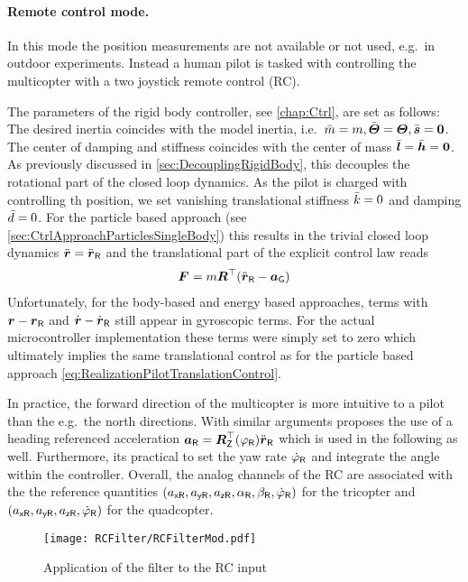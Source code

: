 \paragraph{Remote control mode.}
In this mode the position measurements are not available or not used, e.g.\ in outdoor experiments.
Instead a human pilot is tasked with controlling the multicopter with a two joystick remote control (RC).

The parameters of the rigid body controller, see \autoref{chap:Ctrl}, are set as follows:
The desired inertia coincides with the model inertia, i.e.\ $\bar{m} = m, \bar{\boldsymbol{\varTheta}} = \boldsymbol{\varTheta}, \bar{\boldsymbol{s}}=\boldsymbol{0}$.
The center of damping and stiffness coincides with the center of mass $\bar{\boldsymbol{l}}=\bar{\boldsymbol{h}}=\boldsymbol{0}$.
As previously discussed in \autoref{sec:DecouplingRigidBody}, this decouples the rotational part of the closed loop dynamics.
As the pilot is charged with controlling th position, we set vanishing translational stiffness $\bar{k}=0$ and damping $\bar{d}=0$.
For the particle based approach (see \autoref{sec:CtrlApproachParticlesSingleBody}) this results in the trivial closed loop dynamics $\ddot{\boldsymbol{r}} = \ddot{\boldsymbol{r}}_{\mathsf{R}}$ and the translational part of the explicit control law reads
\begin{align}\label{eq:RealizationPilotTranslationControl}
 \bodyForce{}{} = m \R^\top (\rRdd - \gravityAcc)
\end{align}
Unfortunately, for the body-based and energy based approaches, terms with $\boldsymbol{r}-\boldsymbol{r}_{\mathsf{R}}$ and $\dot{\boldsymbol{r}}-\dot{\boldsymbol{r}}_{\mathsf{R}}$ still appear in gyroscopic terms.
For the actual microcontroller implementation these terms were simply set to zero which ultimately implies the same translational control as for the particle based approach \eqref{eq:RealizationPilotTranslationControl}.

In practice, the forward direction of the multicopter is more intuitive to a pilot than the e.g.\ the north directions.
With similar arguments \cite{Kastelan:Tricopter} proposes the use of a heading referenced acceleration $\boldsymbol{a}_{\mathsf{R}} = \boldsymbol{R}_{\mathsf{Z}}^\top(\varphi_{\mathsf{R}}) \ddot{\boldsymbol{r}}_{\mathsf{R}}$ which is used in the following as well.
Furthermore, its practical to set the yaw rate $\dot{\varphi}_{\mathsf{R}}$ and integrate the angle within the controller.
Overall, the analog channels of the RC are associated with the the reference quantities $(a_{\mathsf{x}\mathsf{R}}, a_{\mathsf{y}\mathsf{R}}, a_{\mathsf{z}\mathsf{R}}, \alpha_{\mathsf{R}}, \beta_{\mathsf{R}}, \dot{\varphi}_{\mathsf{R}})$ for the tricopter and $(a_{\mathsf{x}\mathsf{R}}, a_{\mathsf{y}\mathsf{R}}, a_{\mathsf{z}\mathsf{R}}, \dot{\varphi}_{\mathsf{R}})$ for the quadcopter.

\begin{figure}
\centering
\texttt{[image: RCFilter/RCFilterMod.pdf]} 
\caption{Application of the filter to the RC input}
\label{fig:RCFilter}
\end{figure}


